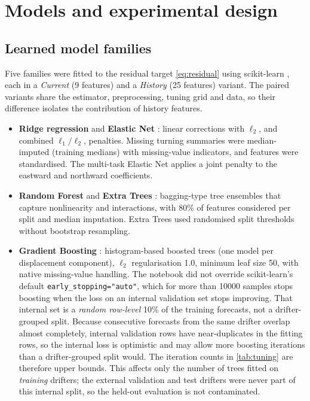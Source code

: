 \section{Models and experimental design}\label{sec:design}

\subsection{Learned model families}
Five families were fitted to the residual target \eqref{eq:residual} using scikit-learn \citep{pedregosa2011}, each in a \emph{Current} (9 features) and a \emph{History} (25 features) variant. The paired variants share the estimator, preprocessing, tuning grid and data, so their difference isolates the contribution of history features.
\begin{itemize}
  \item \textbf{Ridge regression} \citep{hoerl1970} and \textbf{Elastic Net} \citep{zou2005}: linear corrections with $\ell_2$, and combined $\ell_1/\ell_2$, penalties. Missing turning summaries were median-imputed (training medians) with missing-value indicators, and features were standardised. The multi-task Elastic Net applies a joint penalty to the eastward and northward coefficients.
  \item \textbf{Random Forest} \citep{breiman2001} and \textbf{Extra Trees} \citep{geurts2006}: bagging-type tree ensembles that capture nonlinearity and interactions, with 80\% of features considered per split and median imputation. Extra Trees used randomised split thresholds without bootstrap resampling.
  \item \textbf{Gradient Boosting} \citep{friedman2001}: histogram-based boosted trees (one model per displacement component), $\ell_2$ regularisation 1.0, minimum leaf size 50, with native missing-value handling. The notebook did not override scikit-learn's default \texttt{early\_stopping="auto"}, which for more than \num{10000} samples stops boosting when the loss on an internal validation set stops improving. That internal set is a \emph{random row-level} 10\% of the training forecasts, not a drifter-grouped split. Because consecutive forecasts from the same drifter overlap almost completely, internal validation rows have near-duplicates in the fitting rows, so the internal loss is optimistic and may allow more boosting iterations than a drifter-grouped split would. The iteration counts in \cref{tab:tuning} are therefore upper bounds. This affects only the number of trees fitted on \emph{training} drifters; the external validation and test drifters were never part of this internal split, so the held-out evaluation is not contaminated.
\end{itemize}

